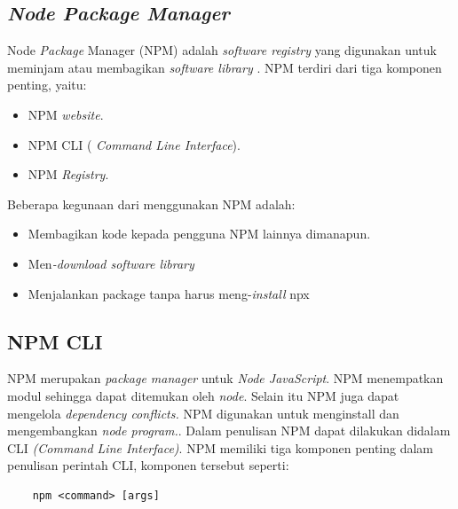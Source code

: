 



\subsection{\textit{Node Package Manager}}
Node \textit{Package} Manager (NPM) adalah \textit{software registry} yang digunakan untuk meminjam atau membagikan \textit{software library} \cite{npmAbout}. NPM terdiri dari tiga komponen penting, yaitu:
\begin{itemize}
    \item NPM \textit{website}.
    \item NPM CLI ( \textit{Command Line Interface}). 
    \item NPM \textit{Registry}.
\end{itemize}

Beberapa kegunaan dari menggunakan NPM adalah:
\begin{itemize}
    \item Membagikan kode kepada pengguna NPM lainnya dimanapun.
    \item Men\textit{-download software library}
    \item Menjalankan pack\textit{}age tanpa harus meng-\textit{install} npx
\end{itemize}

\subsection{NPM CLI}
NPM merupakan \textit{package manager} untuk \textit{Node JavaScript}. NPM menempatkan modul sehingga dapat ditemukan oleh \textit{node}. Selain itu NPM juga dapat mengelola \textit{dependency conflicts.} NPM digunakan untuk menginstall dan mengembangkan \textit{node program.}. Dalam penulisan NPM dapat dilakukan didalam CLI \textit{(Command Line Interface)}. NPM memiliki tiga komponen penting dalam penulisan perintah CLI, komponen tersebut seperti:
\begin{verbatim}
    npm <command> [args]
\end{verbatim}

